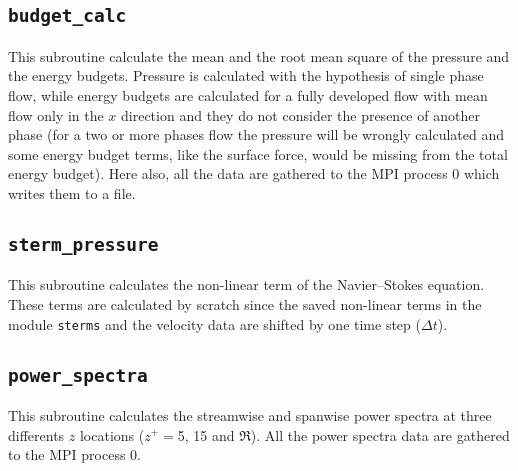 \subsection{\texttt{budget\_calc}}
This subroutine calculate the mean and the root mean square of the pressure and the energy budgets. Pressure is calculated with the hypothesis of single phase flow, while energy budgets are calculated for a fully developed flow with mean flow only in the $x$ direction and they do not consider the presence of another phase (for a two or more phases flow the pressure will be wrongly calculated and some energy budget terms, like the surface force, would be missing from the total energy budget). Here also, all the data are gathered to the MPI process 0 which writes them to a file.

\subsection{\texttt{sterm\_pressure}}
This subroutine calculates the non-linear term of the Navier--Stokes equation. These terms are calculated by scratch since the saved non-linear terms in the module \texttt{sterms} and the velocity data are shifted by one time step ($\Delta t$). 

\subsection{\texttt{power\_spectra}}
This subroutine calculates the streamwise and spanwise power spectra at three differents $z$ locations ($z^+=$5, 15 and $\Re$). All the power spectra data are gathered to the MPI process 0.


